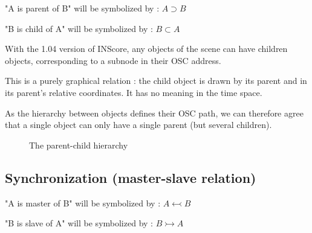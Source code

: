 \documentclass[a4paper]{article}
\newcommand{\parent}			{\supset}
\newcommand{\child}			{\subset}
\newcommand{\master}			{\leftarrowtail}
\newcommand{\slave}			{\rightarrowtail}
\begin{document}
"A is parent of B" will be symbolized by : $A \parent B$

"B is child of A" will be symbolized by : $B \child A$

\bigskip

With the 1.04 version of INScore, any objects of the scene can have children objects, corresponding to a subnode in their OSC address. 

This is a purely graphical relation : the child object is drawn by its parent and in its parent's relative coordinates. It has no meaning in the time space. 

As the hierarchy between objects defines their OSC path, we can therefore agree that a single object can only have a single parent (but several children). 

\bigskip

\begin{figure}[h]
\begin{center}

 \caption{The parent-child hierarchy}
 \label{fig:hierarchy}

\end{center}
\end{figure}

\subsection{Synchronization (master-slave relation)}\label{subsec:sync}

"A is master of B" will be symbolized by : $A \master B$

"B is slave of A" will be symbolized by : $B \slave A$
\bigskip
\end{document}
